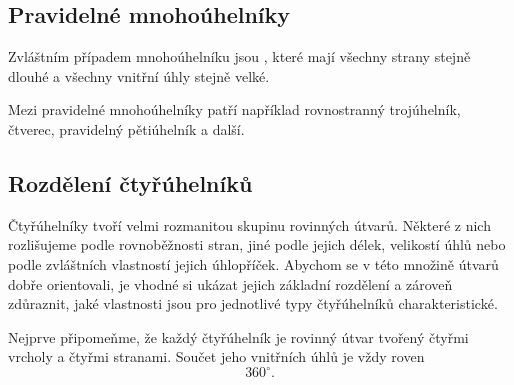 \documentclass[12pt,a4paper]{article}
\begin{document}
\subsection{Pravidelné mnohoúhelníky}
Zvláštním případem mnohoúhelníku jsou , které mají všechny strany stejně dlouhé a všechny vnitřní úhly stejně velké.

Mezi pravidelné mnohoúhelníky patří například rovnostranný trojúhelník, čtverec, pravidelný pětiúhelník a další.

\begin{center}
\end{center}



\subsection{Rozdělení čtyřúhelníků}

Čtyřúhelníky tvoří velmi rozmanitou skupinu rovinných útvarů. Některé z nich rozlišujeme
podle rovnoběžnosti stran, jiné podle jejich délek, velikostí úhlů nebo podle zvláštních
vlastností jejich úhlopříček. Abychom se v této množině útvarů dobře orientovali, je vhodné
si ukázat jejich základní rozdělení a zároveň zdůraznit, jaké vlastnosti jsou pro jednotlivé
typy čtyřúhelníků charakteristické.

Nejprve připomeňme, že každý čtyřúhelník je rovinný útvar tvořený čtyřmi vrcholy a čtyřmi
stranami. Součet jeho vnitřních úhlů je vždy roven
\[
    360^\circ.
\]
\end{document}
